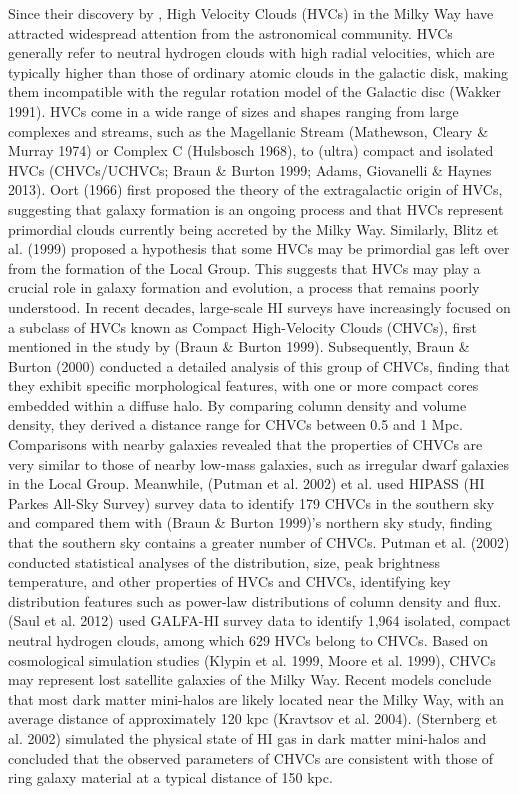 \documentclass[twocolumn,trackchanges]{aastex701}
\begin{document}
Since their discovery by \citep{1963CRAS..257.1661M}, High Velocity Clouds (HVCs) in the Milky Way have attracted widespread attention from the astronomical community. HVCs generally refer to neutral hydrogen clouds with high radial velocities, which are typically higher than those of ordinary atomic clouds in the galactic disk, making them incompatible with the regular rotation model of the Galactic disc (Wakker 1991). HVCs come in a wide range of sizes and shapes ranging from large complexes and streams, such as the Magellanic Stream (Mathewson, Cleary \& Murray 1974) or Complex C (Hulsbosch 1968), to (ultra) compact and isolated HVCs (CHVCs/UCHVCs; Braun \& Burton 1999; Adams, Giovanelli \& Haynes 2013). Oort (1966) first proposed the theory of the extragalactic origin of HVCs, suggesting that galaxy formation is an ongoing process and that HVCs represent primordial clouds currently being accreted by the Milky Way. Similarly, Blitz et al. (1999) proposed a hypothesis that some HVCs may be primordial gas left over from the formation of the Local Group. This suggests that HVCs may play a crucial role in galaxy formation and evolution, a process that remains poorly understood. In recent decades, large-scale HI surveys have increasingly focused on a subclass of HVCs known as Compact High-Velocity Clouds (CHVCs), first mentioned in the study by (Braun \& Burton 1999). Subsequently, Braun \& Burton (2000) conducted a detailed analysis of this group of CHVCs, finding that they exhibit specific morphological features, with one or more compact cores embedded within a diffuse halo. By comparing column density and volume density, they derived a distance range for CHVCs between 0.5 and 1 Mpc. Comparisons with nearby galaxies revealed that the properties of CHVCs are very similar to those of nearby low-mass galaxies, such as irregular dwarf galaxies in the Local Group. Meanwhile, (Putman et al. 2002) et al. used HIPASS (HI Parkes All-Sky Survey) survey data to identify 179 CHVCs in the southern sky and compared them with (Braun \& Burton 1999)'s northern sky study, finding that the southern sky contains a greater number of CHVCs. Putman et al. (2002) conducted statistical analyses of the distribution, size, peak brightness temperature, and other properties of HVCs and CHVCs, identifying key distribution features such as power-law distributions of column density and flux. (Saul et al. 2012) used GALFA-HI survey data to identify 1,964 isolated, compact neutral hydrogen clouds, among which 629 HVCs belong to CHVCs. Based on cosmological simulation studies (Klypin et al. 1999, Moore et al. 1999), CHVCs may represent lost satellite galaxies of the Milky Way. Recent models conclude that most dark matter mini-halos are likely located near the Milky Way, with an average distance of approximately 120 kpc (Kravtsov et al. 2004). (Sternberg et al. 2002) simulated the physical state of HI gas in dark matter mini-halos and concluded that the observed parameters of CHVCs are consistent with those of ring galaxy material at a typical distance of 150 kpc.
\end{document}
